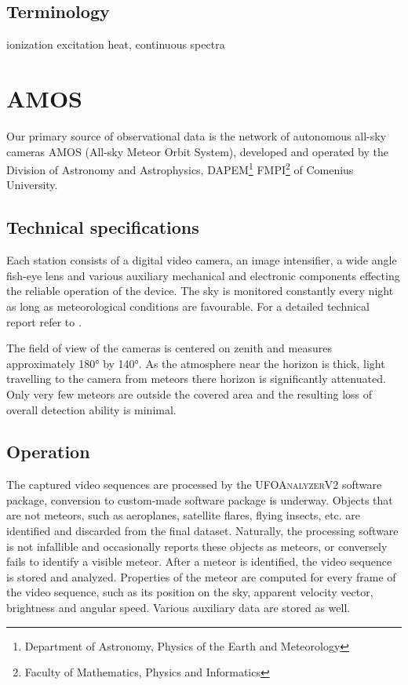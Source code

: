     \subsection{Terminology} \label{ilt}

    ionization
    excitation
    heat, continuous spectra


\section{AMOS} \label{iA}
    Our primary source of observational data is the network of autonomous all-sky cameras AMOS (All-sky Meteor Orbit System),
    developed and operated by the Division of Astronomy and Astrophysics,
    DAPEM\footnote{Department of Astronomy, Physics of the Earth and Meteorology}
    FMPI\footnote{Faculty of Mathematics, Physics and Informatics} of Comenius University.

    \subsection{Technical specifications} \label{iAt}
        Each station consists of a digital video camera, an image intensifier, a wide angle fish-eye lens
        and various auxiliary mechanical and electronic components effecting
        the reliable operation of the device. The sky is monitored constantly every night
        as long as meteorological conditions are favourable. For a detailed technical report refer to \citet{zigo+2013,toth+2015}.

        The field of view of the cameras is centered on zenith and measures approximately \ang{180} by \ang{140}.
        As the atmosphere near the horizon is thick, light travelling to the camera from meteors there horizon is significantly attenuated.
        Only very few meteors are outside the covered area and the resulting loss of overall detection ability is minimal.

    \subsection{Operation} \label{iAo}
        The captured video sequences are processed by the \textsc{UFOAnalyzerV2} software package,
        conversion to custom-made software package is underway.
        Objects that are not meteors, such as aeroplanes, satellite flares, flying insects, etc.
        are identified and discarded from the final dataset. Naturally, the processing software is not
        infallible and occasionally reports these objects as meteors, or conversely fails to identify a visible meteor.
        After a meteor is identified, the video sequence is stored and analyzed.
        Properties of the meteor are computed for every frame of the video sequence,
        such as its position on the sky, apparent velocity vector, brightness and angular speed.
        Various auxiliary data are stored as well.

